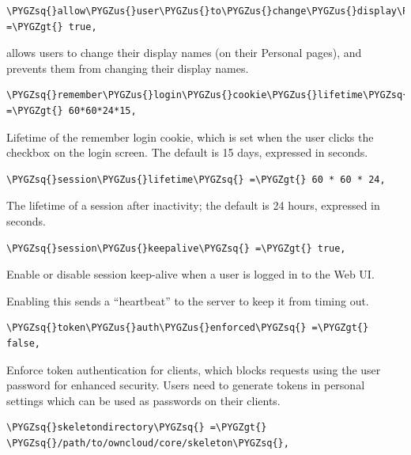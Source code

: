\documentclass[letterpaper,10pt,english]{sphinxmanual}
\def\PYGZus{\char`\_}
\def\PYGZgt{\char`\>}
\def\PYGZsq{\char`\'}
\renewcommand\PYGZsq{\textquotesingle}
\begin{document}
\begin{Verbatim}[commandchars=\\\{\}]
\PYGZsq{}allow\PYGZus{}user\PYGZus{}to\PYGZus{}change\PYGZus{}display\PYGZus{}name\PYGZsq{} =\PYGZgt{} true,
\end{Verbatim}

 allows users to change their display names (on their Personal
pages), and  prevents them from changing their display names.

\begin{Verbatim}[commandchars=\\\{\}]
\PYGZsq{}remember\PYGZus{}login\PYGZus{}cookie\PYGZus{}lifetime\PYGZsq{} =\PYGZgt{} 60*60*24*15,
\end{Verbatim}

Lifetime of the remember login cookie, which is set when the user clicks the
 checkbox on the login screen. The default is 15 days, expressed
in seconds.

\begin{Verbatim}[commandchars=\\\{\}]
\PYGZsq{}session\PYGZus{}lifetime\PYGZsq{} =\PYGZgt{} 60 * 60 * 24,
\end{Verbatim}

The lifetime of a session after inactivity; the default is 24 hours,
expressed in seconds.

\begin{Verbatim}[commandchars=\\\{\}]
\PYGZsq{}session\PYGZus{}keepalive\PYGZsq{} =\PYGZgt{} true,
\end{Verbatim}

Enable or disable session keep-alive when a user is logged in to the Web UI.

Enabling this sends a ``heartbeat'' to the server to keep it from timing out.

\begin{Verbatim}[commandchars=\\\{\}]
\PYGZsq{}token\PYGZus{}auth\PYGZus{}enforced\PYGZsq{} =\PYGZgt{} false,
\end{Verbatim}

Enforce token authentication for clients, which blocks requests using the user
password for enhanced security. Users need to generate tokens in personal settings
which can be used as passwords on their clients.

\begin{Verbatim}[commandchars=\\\{\}]
\PYGZsq{}skeletondirectory\PYGZsq{} =\PYGZgt{} \PYGZsq{}/path/to/owncloud/core/skeleton\PYGZsq{},
\end{Verbatim}
\end{document}
